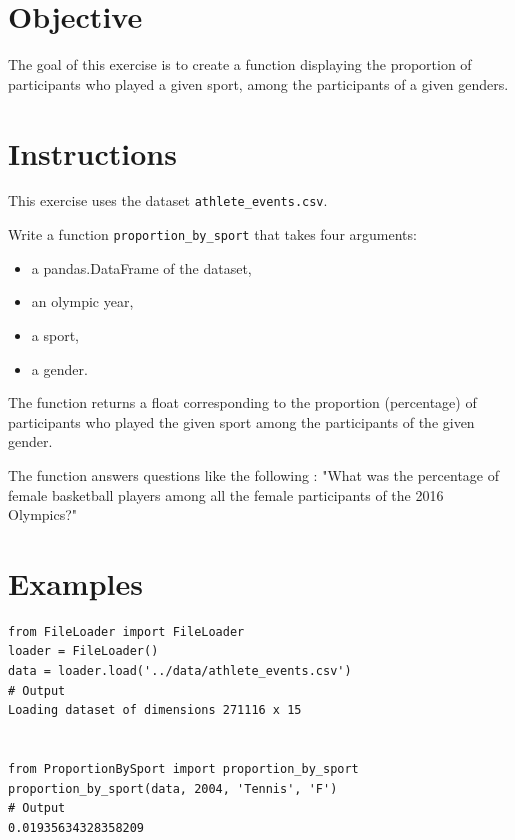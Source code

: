 \documentclass{42-en}
\begin{document}
\section*{Objective}
The goal of this exercise is to create a function displaying
the proportion of participants who played a given sport, among
the participants of a given genders.

\section*{Instructions}
This exercise uses the dataset \texttt{athlete\_events.csv}.

Write a function \texttt{proportion\_by\_sport} that takes four arguments:
\begin{itemize}
  \item a pandas.DataFrame of the dataset,
  \item an olympic year,
  \item a sport,
  \item a gender.
\end{itemize}

The function returns a float corresponding to the proportion (percentage) of participants 
who played the given sport among the participants of the given gender.

The function answers questions like the following : 
"What was the percentage of female basketball players among all the female 
participants of the 2016 Olympics?"



\section*{Examples}
\begin{verbatim}
from FileLoader import FileLoader
loader = FileLoader()
data = loader.load('../data/athlete_events.csv')
# Output
Loading dataset of dimensions 271116 x 15


from ProportionBySport import proportion_by_sport
proportion_by_sport(data, 2004, 'Tennis', 'F')
# Output
0.01935634328358209
\end{verbatim}
\end{document}
